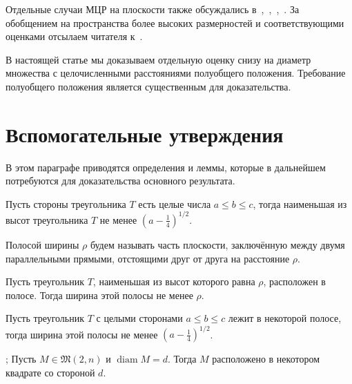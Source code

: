 \documentclass[11pt,twoside,draft
]{article}
\begin{document}
Отдельные случаи МЦР на плоскости также обсуждались
в~\cite[\S 5.11]{brass2006research},~\cite[\S D20]{guy2013unsolved},~\cite{our-pmm-2018},~\cite{our-ped-2018}.
За обобщением на пространства более высоких размерностей и соответствующими оценками
отсылаем читателя к~\cite{kurz2005characteristic,nozaki2013lower}.

В настоящей статье мы доказываем отдельную оценку снизу на диаметр множества с целочисленными расстояниями полуобщего положения.
Требование полуобщего положения является существенным для доказательства.



\section{Вспомогательные утверждения}

В этом параграфе приводятся определения и леммы, которые в дальнейшем потребуются
для доказательства основного результата.


\begin{lemm}
	\cite[наблюдение 1]{solymosi2003note}
	Пусть стороны треугольника $T$ есть целые числа $a \leq b \leq c$,
	тогда наименьшая из высот треугольника $T$ не менее $\left(a - \frac{1}{4}\right)^{1/2}$.
\end{lemm}

\begin{definition}
	Полосой ширины $\rho$ будем называть часть плоскости,
	заключённую между двумя параллельными прямыми,
	отстоящими друг от друга на расстояние $\rho$.
\end{definition}

\begin{lemm}
	\cite{smurov1998stripcoverings}
	Пусть треугольник $T$, наименьшая из высот которого равна $\rho$, расположен в полосе.
	Тогда ширина этой полосы не менее $\rho$.
\end{lemm}

\begin{corollary}
	\label{cor:solymosi_strip}
	Пусть треугольник $T$ с целыми сторонами $a \leq b \leq c$ лежит в некоторой полосе,
	тогда ширина этой полосы не менее $\left(a - \frac{1}{4}\right)^{1/2}$.
\end{corollary}


\begin{lemm}
	\cite[лемма 4]{our-vmmsh-2018};
	\cite[лемма 2.4]{my-pps-linear-bound-2019}
	\label{lem:square_container}
	Пусть $M\in\mathfrak{M}(2,n)$ и $\operatorname{diam} M = d$.
	Тогда $M$ расположено в некотором квадрате со стороной $d$.
\end{lemm}
\end{document}
